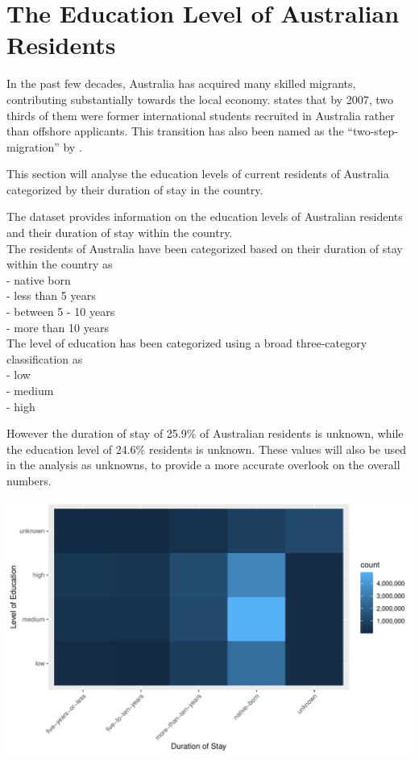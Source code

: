 \documentclass[11pt,a4paper,]{article}
\let\origfigure\figure
\let\endorigfigure\endfigure
\renewenvironment{figure}[1][2] {
    \expandafter\origfigure\expandafter[H]
} {
    \endorigfigure
}%
\begin{document}
\section* {The Education Level of Australian Residents}

In the past few decades, Australia has acquired many skilled migrants, contributing substantially towards the local economy. \textcite{hawthorne2010valuable} states that by 2007, two thirds of them were former international students recruited in Australia rather than offshore applicants. This transition has also been named as the ``two-step-migration'' by \textcite{hawthorne2010valuable}.

This section will analyse the education levels of current residents of Australia categorized by their duration of stay in the country.

The dataset provides information on the education levels of Australian residents and their duration of stay within the country.\\
The residents of Australia have been categorized based on their duration of stay within the country as\\
- native born\\
- less than 5 years\\
- between 5 - 10 years\\
- more than 10 years\\
The level of education has been categorized using a broad three-category classification as\\
- low\\
- medium\\
- high

However the duration of stay of 25.9\% of Australian residents is unknown, while the education level of 24.6\% residents is unknown. These values will also be used in the analysis as unknowns, to provide a more accurate overlook on the overall numbers.

\begin{figure}
\centering
\includegraphics{ETC5513assignment4_files/figure-latex/tile-plot-edu-vs-duration-1.pdf}
\caption{\label{fig:tile-plot-edu-vs-duration}Breakdown of Australian residents based on their level of Education and duration of stay in Australia}
\end{figure}
\end{document}
